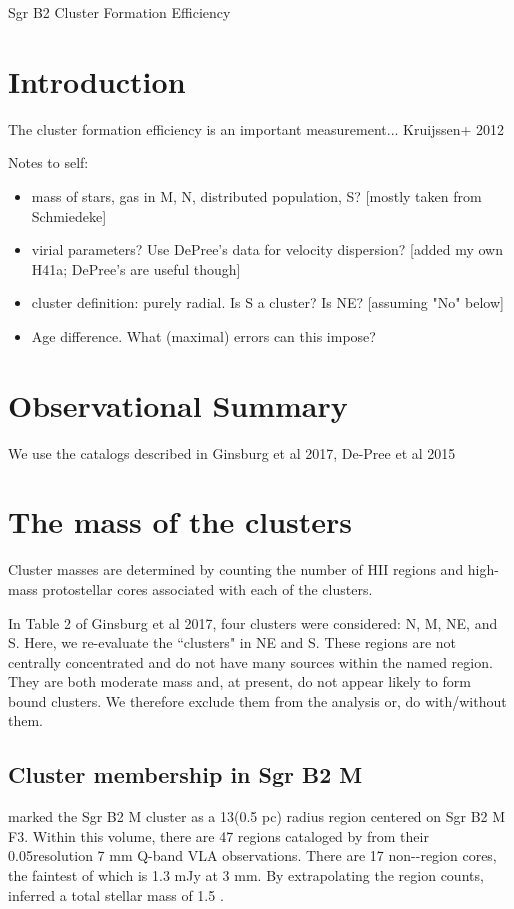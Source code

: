 \documentclass[twocolumn]{aastex61}
\begin{document}
Sgr B2 Cluster Formation Efficiency

\section{Introduction}

The cluster formation efficiency is an important measurement...
Kruijssen+ 2012

Notes to self:
\begin{itemize}
    \item mass of stars, gas in M, N, distributed population, S? [mostly taken from Schmiedeke]
    \item virial parameters?  Use DePree's data for velocity dispersion?  [added my own H41a; DePree's are useful though]
    \item cluster definition: purely radial.  Is S a cluster?  Is NE?  [assuming "No" below]
    \item Age difference.  What (maximal) errors can this impose?
\end{itemize}

\section{Observational Summary}


We use the catalogs described in Ginsburg et al 2017, De-Pree et al 2015


\section{The mass of the clusters}
Cluster masses are determined by counting the number of HII regions and high-mass
protostellar cores associated with each of the clusters.

In Table 2 of Ginsburg et al 2017, four clusters were considered: N, M, NE, and
S.  Here, we re-evaluate the ``clusters" in NE and S.  These regions are not
centrally concentrated and do not have many sources within the named region.
They are both moderate mass and, at present, do not appear likely to form bound
clusters.  We therefore exclude them from the analysis {\color{red} or, do with/without
them}.

\subsection{Cluster membership in Sgr B2 M}
\citet{Schmiedeke2016a} marked the Sgr B2 M cluster as a 13\arcsec  (0.5 pc) radius
region centered on Sgr B2 M F3.  Within this volume, there are 47 \hii regions
cataloged by \citet{De-Pree201?} from their 0.05\arcsec resolution 7 mm Q-band
VLA observations.  There are 17 non-\hii-region cores, the faintest of which is
1.3 mJy at 3 mm.  By extrapolating the \hii region counts,
\citet{Ginsburg2017c} inferred a total stellar mass of 1.5 \msun.
\end{document}
